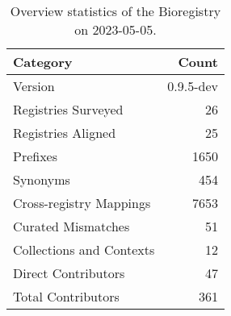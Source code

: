 \begin{table}
\caption{Overview statistics of the Bioregistry on 2023-05-05.}
\label{tab:bioregistry-summary}
\begin{tabular}{lr}
\toprule
Category & Count \\
\midrule
Version & 0.9.5-dev \\
Registries Surveyed & 26 \\
Registries Aligned & 25 \\
Prefixes & 1650 \\
Synonyms & 454 \\
Cross-registry Mappings & 7653 \\
Curated Mismatches & 51 \\
Collections and Contexts & 12 \\
Direct Contributors & 47 \\
Total Contributors & 361 \\
\bottomrule
\end{tabular}
\end{table}
